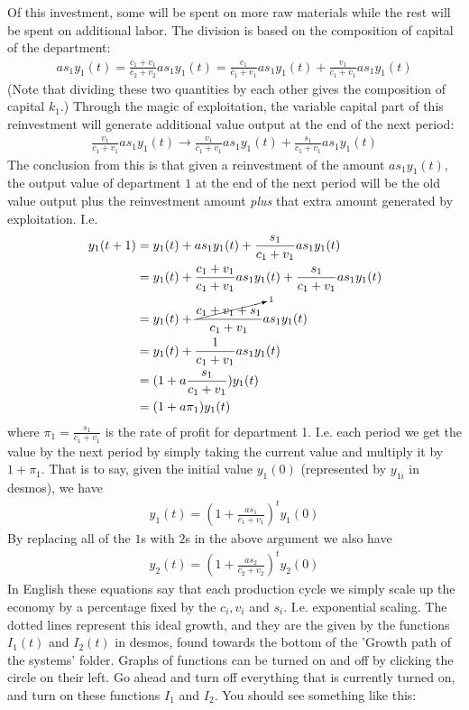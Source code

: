 \documentclass{article}
\theoremstyle{theorem}
\begin{document}
Of this investment, some will be spent on more raw materials while the rest will be spent on additional labor. The division is based on the composition of capital of the department:
\begin{align}
	as_1y_1(t) = \frac{c_1+v_1}{c_2+v_2}as_1y_1(t) = \frac{c_1}{c_1+v_1}as_1y_1(t)+\frac{v_1}{c_1+v_1}as_1y_1(t) 
\end{align} 
(Note that dividing these two quantities by each other gives the composition of capital $k_1$.) Through the magic of exploitation, the variable capital part of this reinvestment will generate additional value output at the end of the next period:
\begin{align}
	\frac{v_1}{c_1+v_1}as_1y_1(t) \to \frac{v_1}{c_1+v_1}as_1y_1(t)+\frac{s_1}{c_1+v_1}as_1y_1(t) 
\end{align} 
The conclusion from this is that given a reinvestment of the amount $as_1y_1(t)$, the output value of department $1$ at the end of the next period will be the old value output plus the reinvestment amount \emph{plus} that extra amount generated by exploitation. I.e.
\begin{align}
	 y_1(t+1) &= y_1(t) + as_1y_1(t) + \frac{s_1}{c_1+v_1}as_1y_1(t) \\
	 		&= y_1(t) + \frac{c_1+v_1}{c_1+v_1}as_1y_1(t) + \frac{s_1}{c_1+v_1}as_1y_1(t) \\
	 		&= y_1(t) + \frac{\cancelto{1}{c_1+v_1+s_1}}{c_1+v_1}as_1y_1(t) \\
	 		&= y_1(t) + \frac{1}{c_1+v_1}as_1y_1(t) \\
	 		&= (1+a\frac{s_1}{c_1+v_1})y_1(t)  \\
	 		&= (1+a\pi_1)y_1(t)
\end{align}
where $\pi_1 = \frac{s_1}{c_1+v_1}$ is the rate of profit for department 1. I.e. each period we get the value by the next period by simply taking the current value and multiply it by $1+\pi_1$. That is to say, given the initial value $y_1(0)$ (represented by $y_{1i}$ in desmos), we have
\begin{align}
	y_1(t) = (1+\frac{as_1}{c_1+v_1})^ty_1(0) \label{dept1Ideal}
\end{align} 
By replacing all of the $1$s with $2$s in the above argument we also have
\begin{align}
	y_2(t) = (1+\frac{as_2}{c_2+v_2})^ty_2(0) \label{dept2Ideal}
\end{align} 
In English these equations say that each production cycle we simply scale up the economy by a percentage fixed by the $c_i,v_i$ and $s_i$. I.e. exponential scaling. The dotted lines represent this ideal growth, and they are the given by the functions $I_1(t)$ and $I_2(t)$ in desmos, found towards the bottom of the 'Growth path of the systems' folder. Graphs of functions can be turned on and off by clicking the circle on their left. Go ahead and turn off everything that is currently turned on, and turn on these functions $I_1$ and $I_2$. You should see something like this:
\end{document}
